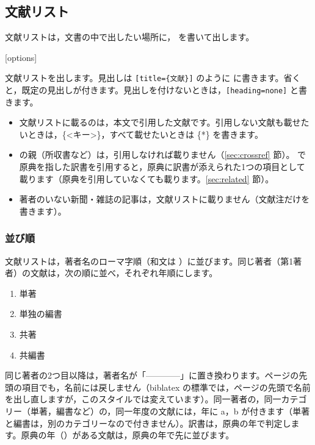 \subsection{文献リスト}
文献リストは，文書の中で出したい場所に， を書いて出します。

\begin{ltxsyntax}
[options]

文献リストを出します。見出しは \texttt{[title=\{文献\}]} のように  に書きます。省くと，既定の見出しが付きます。見出しを付けないときは，\texttt{[heading=none]} と書きます。
\end{ltxsyntax}

\begin{itemize}
\item 文献リストに載るのは，本文で引用した文献です。引用しない文献も載せたいときは，\{<キー>\}，すべて載せたいときは \{*\} を書きます。
\item {} の親（所収書など）は，引用しなければ載りません（\ref{sec:crossref} 節）。 で原典を指した訳書を引用すると，原典に訳書が添えられた1つの項目として載ります（原典を引用していなくても載ります。\ref{sec:related} 節）。
\item 著者のいない新聞・雑誌の記事は，文献リストに載りません（文献注だけを書きます）。
\end{itemize}

\subsubsection{並び順}\label{sec:sorting}
文献リストは，著者名のローマ字順（和文は ）に並びます。同じ著者（第1著者）の文献は，次の順に並べ，それぞれ年順にします。

\begin{enumerate}
\item 単著
\item 単独の編書
\item 共著
\item 共編書
\end{enumerate}

同じ著者の2つ目以降は，著者名が「————」に置き換わります。ページの先頭の項目でも，名前には戻しません（biblatex の標準では，ページの先頭で名前を出し直しますが，このスタイルでは変えています）。同一著者の，同一カテゴリー（単著，編書など）の，同一年度の文献には，年に a，b が付きます（単著と編書は，別のカテゴリーなので付きません）。訳書は，原典の年で判定します。原典の年（）がある文献は，原典の年で先に並びます。

